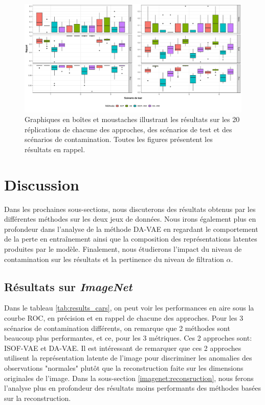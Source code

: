 \begin{figure}[H]
	\centering
	\includegraphics[width=\linewidth]{images/images_boxplots/recall_mnist.pdf}
	\caption{Graphiques en boîtes et moustaches illustrant les résultats sur les 20 réplications de chacune des approches, des scénarios de test et des scénarios de contamination. Toutes les figures présentent les résultats en rappel.}
	\label{fig:recall_mnist}
\end{figure}

\section{Discussion} \label{discussion}

Dans les prochaines sous-sections, nous discuterons des résultats obtenus par les différentes méthodes sur les deux jeux de données. Nous irons également plus en profondeur dans l'analyse de la méthode DA-VAE en regardant le comportement de la perte en entraînement ainsi que la composition des représentations latentes produites par le modèle. Finalement, nous étudierons l'impact du niveau de contamination sur les résultats et la pertinence du niveau de filtration $\alpha$.

\subsection{Résultats sur \textit{ImageNet}} \label{imagenet_results}

Dans le tableau \ref{tab:results_cars}, on peut voir les performances en aire sous la courbe ROC, en précision et en rappel de chacune des approches. Pour les 3 scénarios de contamination différents, on remarque que 2 méthodes sont beaucoup plus performantes, et ce, pour les 3 métriques. Ces 2 approches sont: ISOF-VAE et DA-VAE. Il est intéressant de remarquer que ces 2 approches utilisent la représentation latente de l'image pour discriminer les anomalies des observations "normales" plutôt que la reconstruction faite sur les dimensions originales de l'image. Dans la sous-section \ref{imagenet:reconsruction}, nous ferons l'analyse plus en profondeur des résultats moins performants des méthodes basées sur la reconstruction.

